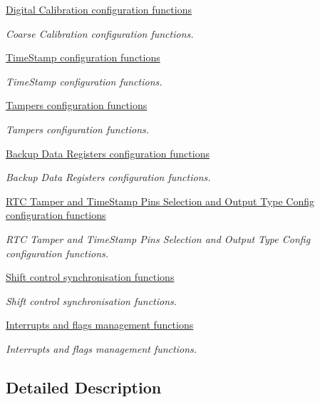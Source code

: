 \begin{DoxyCompactItemize}
\hyperlink{group___r_t_c___group7}{Digital Calibration configuration functions}
\begin{DoxyCompactList}\small\item\em Coarse Calibration configuration functions. \end{DoxyCompactList}\item 
\hyperlink{group___r_t_c___group8}{Time\+Stamp configuration functions}
\begin{DoxyCompactList}\small\item\em Time\+Stamp configuration functions. \end{DoxyCompactList}\item 
\hyperlink{group___r_t_c___group9}{Tampers configuration functions}
\begin{DoxyCompactList}\small\item\em Tampers configuration functions. \end{DoxyCompactList}\item 
\hyperlink{group___r_t_c___group10}{Backup Data Registers configuration functions}
\begin{DoxyCompactList}\small\item\em Backup Data Registers configuration functions. \end{DoxyCompactList}\item 
\hyperlink{group___r_t_c___group11}{R\+T\+C Tamper and Time\+Stamp Pins Selection and Output Type Config configuration functions}
\begin{DoxyCompactList}\small\item\em R\+T\+C Tamper and Time\+Stamp Pins Selection and Output Type Config configuration functions. \end{DoxyCompactList}\item 
\hyperlink{group___r_t_c___group12}{Shift control synchronisation functions}
\begin{DoxyCompactList}\small\item\em Shift control synchronisation functions. \end{DoxyCompactList}\item 
\hyperlink{group___r_t_c___group13}{Interrupts and flags management functions}
\begin{DoxyCompactList}\small\item\em Interrupts and flags management functions. \end{DoxyCompactList}\end{DoxyCompactItemize}


\subsection{Detailed Description}
